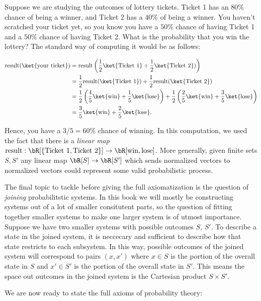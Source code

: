 \begin{ex}
Suppose we are studying the outcomes of lottery tickets. Ticket 1 has an $80\%$ chance of being a winner, and Ticket 2 has a $40\%$ of being a winner. You haven't scratched your ticket yet, so you know you have a $50\%$ chance of having Ticket 1 and a $50\%$ chance of having Ticket 2. What is the probability that you win the lottery? The standard way of computing it would be as follows:

\begin{align*}
\text{result}(\ket{\text{your ticket}})&=\text{result}\left(\frac{1}{2}\ket{\text{Ticket 1}}+\frac{1}{2}\ket{\text{Ticket 2}})\right)\\
&=\frac{1}{2}\text{result}(\ket{\text{Ticket 1}})+\frac{1}{2}\text{result}(\ket{\text{Ticket 2}})\\
&=\frac{1}{2}\left(\frac{4}{5}\ket{\text{win}}+\frac{1}{5}\ket{\text{lose}}\right)+\frac{1}{2}\left(\frac{2}{5}\ket{\text{win}}+\frac{3}{5}\ket{\text{lose}}\right)\\
&=\frac{3}{5}\ket{\text{win}}+\frac{2}{5}\ket{\text{lose}}.
\end{align*}

Hence, you have a $3/5=60\%$ chance of winning. In this computation, we used the fact that there is a {\em linear map} $\text{result}:\bR[\{\text{Ticket 1}, \text{Ticket 2}\}]\to \bR[\text{win},\text{lose}]$. More generally, given finite sets $S,S'$ any linear map $\bR[S]\to\bR[S']$ which sends normalized vectors to normalized vectors could represent some valid probabilistic process.
\end{ex}

The final topic to tackle before giving the full axiomatization is the question of {\em joining} probabilitstic systems. In this book we will mostly be constructing systems out of a lot of smaller consitutent parts, so the question of fitting together smaller systems to make one larger system is of utmost importance. Suppose we have two smaller systems with possible outcomes $S$, $S'$. To describe a state in the joined system, it is neccecary and sufficient to describe how that state restricts to each subsystem. In this way, possible outcomes of the joined system will correspond to pairs $(x,x')$ where $x\in S$ is the portion of the overall state in $S$ and $x'\in S'$ is the portion of the overall state in $S'$. This means the space out outcomes in the joined system is the Cartesian product $S\times S'$.

We are now ready to state the full axioms of probability theory:

